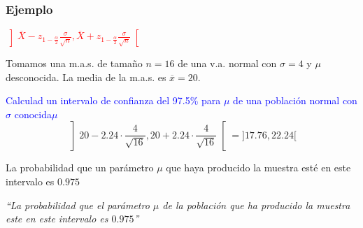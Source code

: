 \documentclass[12pt,t]{beamer}\usepackage[]{graphicx}\usepackage[]{color}
\newcommand{\red}[1]{\textcolor{red}{#1}}
\newcommand{\blue}[1]{\textcolor{blue}{#1}}
\theoremstyle{plain}
\theoremstyle{definition}
\begin{document}
\begin{frame}
\frametitle{Ejemplo}
\red{$\displaystyle
\left]\overline{X} -z_{1-\frac{\alpha}{2}} \frac{\sigma}{\sqrt{n}}, \overline{X}+z_{1-\frac{\alpha}{2}}\frac{\sigma}{\sqrt{n}}
\right[$}
\medskip


Tomamos una m.a.s. de  tamaño  $n=16$ de una v.a. normal con $\sigma=4$ y $\mu$ desconocida. La media   de la m.a.s. es
$\overline{x}=20$.
\medskip

\blue{Calculad un intervalo de confianza  del 97.5\%  para $\mu$ de  una población normal con $\sigma$ conocida$\mu$}
\pause
$$
\left] 20-2.24\cdot \frac{4}{\sqrt{16}} ,
20+2.24\cdot \frac{4}{\sqrt{16}}
\right[
=]17.76,22.24[
$$

La probabilidad que un parámetro $\mu$ que haya producido la muestra esté en este intervalo  es $0.975$
\pause\medskip

\textsl{``La probabilidad que el parámetro $\mu$  de la población que ha producido la muestra este  en este intervalo  es $0.975$''}


\end{frame}

\end{document}
